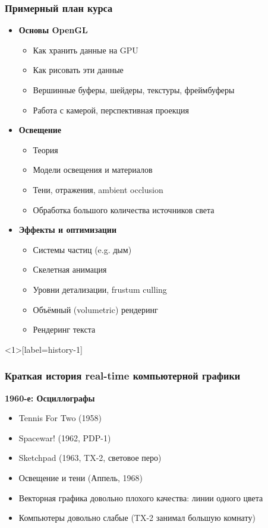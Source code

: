 \documentclass[10pt]{beamer}
\begin{document}
\begin{frame}
\frametitle{Примерный план курса}
\pause
\begin{itemize}
\item \textbf{Основы OpenGL}
\begin{itemize}
\item Как хранить данные на GPU
\item Как рисовать эти данные
\item Вершинные буферы, шейдеры, текстуры, фреймбуферы
\item Работа с камерой, перспективная проекция
\end{itemize}
\pause
\item \textbf{Освещение}
\begin{itemize}
\item Теория
\item Модели освещения и материалов
\item Тени, отражения, ambient occlusion
\item Обработка большого количества источников света
\end{itemize}
\pause
\item \textbf{Эффекты и оптимизации}
\begin{itemize}
\item Системы частиц (e.g. дым)
\item Скелетная анимация
\item Уровни детализации, frustum culling
\item Объёмный (volumetric) рендеринг
\item Рендеринг текста
\end{itemize}
\end{itemize}
\end{frame}

\begin{frame}<1>[label=history-1]
\frametitle{Краткая история real-time компьютерной графики}
\textbf{1960-е: Осциллографы}
\pause
\begin{itemize}
\item Tennis For Two (1958)
\pause
\item Spacewar! (1962, PDP-1)
\pause
\item Sketchpad (1963, TX-2, световое перо)
\pause
\item Освещение и тени (Аппель, 1968)
\pause
\item Векторная графика довольно плохого качества: линии одного цвета
\item Компьютеры довольно слабые (TX-2 занимал большую комнату)
\end{itemize}
\end{frame}
\end{document}
